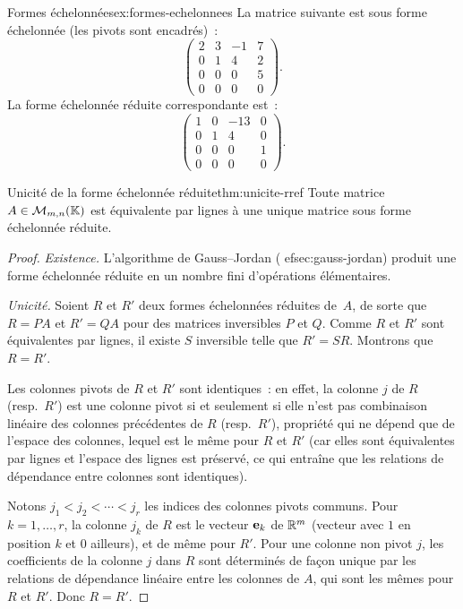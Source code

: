 \begin{example}{Formes échelonnées}{ex:formes-echelonnees}
  La matrice suivante est sous forme échelonnée (les pivots sont encadrés)~:
  \[
    \begin{pmatrix}
      \boxed{2} & 3 & -1 & 7\\
      0 & \boxed{1} & 4 & 2\\
      0 & 0 & 0 & \boxed{5}\\
      0 & 0 & 0 & 0
    \end{pmatrix}.
  \]
  La forme échelonnée réduite correspondante est~:
  \[
    \begin{pmatrix}
      \boxed{1} & 0 & -13 & 0\\
      0 & \boxed{1} & 4 & 0\\
      0 & 0 & 0 & \boxed{1}\\
      0 & 0 & 0 & 0
    \end{pmatrix}.
  \]
\end{example}

\begin{theorem}{Unicité de la forme échelonnée réduite}{thm:unicite-rref}
  Toute matrice $A\in\mathcal{M}_{m,n}({\mathbb{K}})$ est équivalente par lignes à une
  unique matrice sous forme échelonnée réduite.
\end{theorem}

\begin{proof}
  \emph{Existence.} L'algorithme de Gauss--Jordan (
ef{sec:gauss-jordan})
  produit une forme échelonnée réduite en un nombre fini d'opérations
  élémentaires.

  \emph{Unicité.} Soient $R$ et $R'$ deux formes échelonnées réduites
  de~$A$, de sorte que $R=PA$ et $R'=QA$ pour des matrices inversibles $P$
  et $Q$. Comme $R$ et $R'$ sont équivalentes par lignes, il existe $S$
  inversible telle que $R'=SR$. Montrons que $R=R'$.

  Les colonnes pivots de $R$ et $R'$ sont identiques~: en effet, la colonne
  $j$ de $R$ (resp.~$R'$) est une colonne pivot si et seulement si elle
  n'est pas combinaison linéaire des colonnes précédentes de $R$
  (resp.~$R'$), propriété qui ne dépend que de l'espace des colonnes, lequel
  est le même pour $R$ et $R'$ (car elles sont équivalentes par lignes et
  l'espace des lignes est préservé, ce qui entraîne que les relations de
  dépendance entre colonnes sont identiques).

  Notons $j_1<j_2<\cdots<j_r$ les indices des colonnes pivots communs.
  Pour $k=1,\ldots,r$, la colonne $j_k$ de $R$ est le vecteur $\mathbf{e}_{k}$
  de ${\mathbb{R}}^m$ (vecteur avec $1$ en position $k$ et $0$ ailleurs), et de même
  pour $R'$. Pour une colonne non pivot $j$, les coefficients de la colonne
  $j$ dans $R$ sont déterminés de façon unique par les relations de
  dépendance linéaire entre les colonnes de $A$, qui sont les mêmes pour
  $R$ et $R'$. Donc $R=R'$.
\end{proof}

